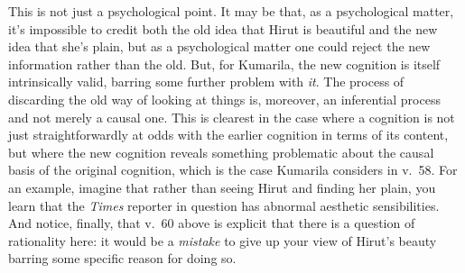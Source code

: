 \documentclass[11pt,letterpaper,oneside]{amsart}
\newenvironment{squote}{\begin{quote}\sf\small}{\rm\end{quote}} %
\newcommand{\kum}{Kum\={a}rila}
\begin{document}
This is not just a psychological point. It may be that, as a psychological matter, it's impossible to credit both the old idea that Hirut is beautiful and the new idea that she's plain, but as a psychological matter one could reject the new information rather than the old. But, for Kumarila, the new cognition is itself intrinsically valid, barring some further problem with \emph{it}. The process of discarding the old way of looking at things is, moreover, an inferential process and not merely a causal one. This is clearest in the case where a cognition is not just straightforwardly at odds with the earlier cognition in terms of its content, but where the new cognition reveals something problematic about the causal basis of the original cognition, which is the case Kumarila considers in v.\ 58. For an example, imagine that rather than seeing Hirut and finding her plain, you learn that the \emph{Times} reporter in question has abnormal aesthetic sensibilities. And notice, finally, that v.\ 60 above is explicit that there is a question of rationality here: it would be a \emph{mistake} to give up your view of Hirut's beauty barring some specific reason for doing so.

\end{document}
